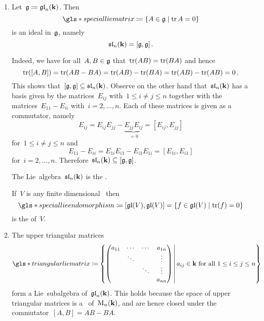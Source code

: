 \begin{examples}
  \leavevmode
  \begin{enumerate}
    \item
      Let~$\mathfrak{g} \coloneqq \mathfrak{gl}_n(\mathbf{k})$.
      Then
      \[
        \gls*{special lie matrix}
        \defined
        \{
          A \in \glie
        \suchthat
          \tr A = 0
        \}
      \]
      is an ideal in~$\mathfrak{g}$, namely
      \[
        \mathfrak{sl}_n(\mathbf{k})
        =
        [\mathfrak{g},\mathfrak{g}]  \,.
      \]
        
      Indeed, we have for all~$A, B \in \mathfrak{g}$ that~$\operatorname{tr}(AB) = \operatorname{tr}(BA)$ and hence
      \[
          \operatorname{tr}( [A,B] )
        = \operatorname{tr}(AB-BA)
        = \operatorname{tr}(AB) - \operatorname{tr}(BA)
        = \operatorname{tr}(AB) - \operatorname{tr}(AB)
        = 0  \,.
      \]
      This shows that~$[\mathfrak{g}, \mathfrak{g}] \subseteq \mathfrak{sl}_n(\mathbf{k})$.
      Observe on the other hand that~$\mathfrak{sl}_n(\mathbf{k})$ has a basis given by the matrices~$E_{ij}$ with~$1 \leq i \neq j \leq n$ together with the matrices~$E_{11} - E_{ii}$ with~$i = 2, \dotsc, n$.
      Each of these matrices is given as a commutator, namely
      \[
          E_{ij}
          =
          E_{ij} E_{jj} - \underbrace{ E_{jj} E_{ij} }_{=0}
          =
          [E_{ij}, E_{jj}]
      \]
      for~$1 \leq i \neq j \leq n$ and
      \[
        E_{11} - E_{ii}
        =
        E_{1i} E_{i1} - E_{i1} E_{1i}
        =
        [E_{1i}, E_{i1}]
      \]
      for~$i = 2, \dotsc, n$.
      Therefore~$\mathfrak{sl}_n(\mathbf{k}) \subseteq [\mathfrak{g}, \mathfrak{g}]$.
      
      The Lie~algebra~$\mathfrak{sl}_n(\mathbf{k})$ is the .
      
      If~$V$ is any finite dimensional~{\vectorspace{$\kf$}} then
      \[
        \gls*{special lie endomorphism}
        \defined
        [\gllie(V), \gllie(V)]
        =
        \{
          f \in \gllie(V)
        \suchthat
          \tr(f) = 0
        \}
      \]
      is the  of~$V$.
   
    \item
      The upper triangular matrices
      \[
        \gls*{triangular lie matrix}
        \defined
        \left\{
          \begin{pmatrix}
              a_{11}
            & \cdots
            & \cdots
            & a_{1n}
            \\
              {}
            & \ddots
            & {}
            & \vdots
            \\
              {}
            & {}
            & \ddots
            & \vdots
            \\
              {}
            & {}
            & {}
            & a_{nn}
          \end{pmatrix}
        \suchthat*
          \text{$a_{ij} \in \kf$ for all~$1 \leq i \leq j \leq n$}
        \right\}
      \]
      form a Lie~subalgebra of~$\mathfrak{gl}_n(\mathbf{k})$.
      This holds because the space of upper triangular matrices is a~{\subalgebra{$\kf$}} of~$\operatorname{M}_n(\mathbf{k})$, and are hence closed under the commutator~$[A,B] = AB - BA$.
   

\end{enumerate}
\end{examples}
